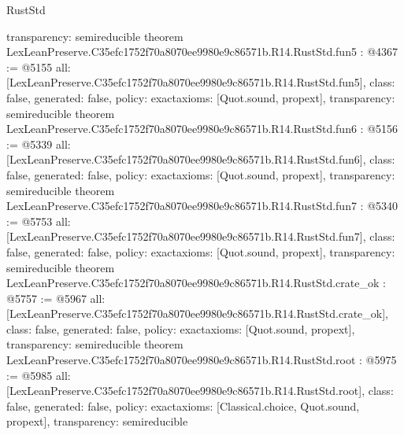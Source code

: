 \begin{lexlean}{RustStd}
\begin{coremodule}
{  transparency: semireducible
}
theorem LexLeanPreserve.C35efc1752f70a8070ee9980e9c86571b.R14.RustStd.fun5 : @4367 := @5155 {
  all: [LexLeanPreserve.C35efc1752f70a8070ee9980e9c86571b.R14.RustStd.fun5],
  class: false,
  generated: false,
  policy: exact{axioms: [Quot.sound, propext]},
  transparency: semireducible
}
theorem LexLeanPreserve.C35efc1752f70a8070ee9980e9c86571b.R14.RustStd.fun6 : @5156 := @5339 {
  all: [LexLeanPreserve.C35efc1752f70a8070ee9980e9c86571b.R14.RustStd.fun6],
  class: false,
  generated: false,
  policy: exact{axioms: [Quot.sound, propext]},
  transparency: semireducible
}
theorem LexLeanPreserve.C35efc1752f70a8070ee9980e9c86571b.R14.RustStd.fun7 : @5340 := @5753 {
  all: [LexLeanPreserve.C35efc1752f70a8070ee9980e9c86571b.R14.RustStd.fun7],
  class: false,
  generated: false,
  policy: exact{axioms: [Quot.sound, propext]},
  transparency: semireducible
}
theorem LexLeanPreserve.C35efc1752f70a8070ee9980e9c86571b.R14.RustStd.crate_ok : @5757 := @5967 {
  all: [LexLeanPreserve.C35efc1752f70a8070ee9980e9c86571b.R14.RustStd.crate_ok],
  class: false,
  generated: false,
  policy: exact{axioms: [Quot.sound, propext]},
  transparency: semireducible
}
theorem LexLeanPreserve.C35efc1752f70a8070ee9980e9c86571b.R14.RustStd.root : @5975 := @5985 {
  all: [LexLeanPreserve.C35efc1752f70a8070ee9980e9c86571b.R14.RustStd.root],
  class: false,
  generated: false,
  policy: exact{axioms: [Classical.choice, Quot.sound, propext]},
  transparency: semireducible
}


\end{coremodule}
\end{lexlean}
